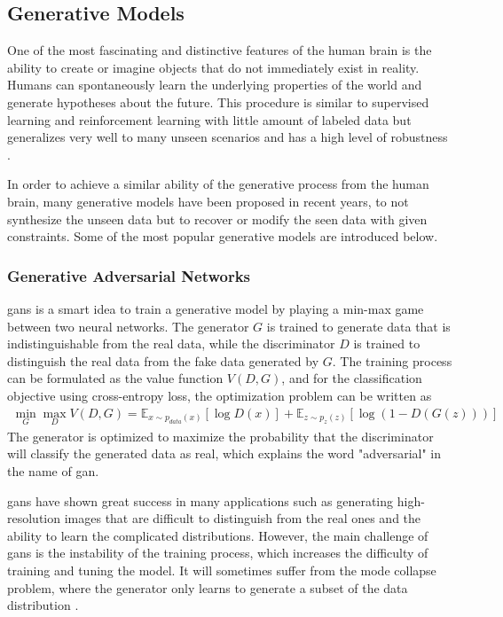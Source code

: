 \documentclass[12pt,DIV14,BCOR12mm,a4paper,footinclude=false,headinclude,parskip=half-,twoside,openright,cleardoublepage=empty,toc=index,bibliography=totoc,listof=totoc]{scrreprt}
\numberwithin{equation}{chapter}
\begin{document}
\subsection{Generative Models}
One of the most fascinating and distinctive features of the human brain is the ability to create or imagine objects that do not immediately exist in reality. Humans can spontaneously learn the underlying properties of the world and generate hypotheses about the future. This procedure is similar to supervised learning and reinforcement learning with little amount of labeled data but generalizes very well to many unseen scenarios and has a high level of robustness \cite{lamb2021brief}.

In order to achieve a similar ability of the generative process from the human brain, many generative models have been proposed in recent years, to not synthesize the unseen data but to recover or modify the seen data with given constraints. Some of the most popular generative models are introduced below.

\subsubsection{Generative Adversarial Networks}
\glspl{gan} \cite{goodfellow2014generative} is a smart idea to train a generative model by playing a min-max game between two neural networks. The generator $G$ is trained to generate data that is indistinguishable from the real data, while the discriminator $D$ is trained to distinguish the real data from the fake data generated by $G$. The training process can be formulated as the value function $V(D,G)$, and for the classification objective using cross-entropy loss, the optimization problem can be written as
\begin{align}
  \min_{G} \max_{D} V(D,G) = \mathbb{E}_{x\sim p_{data}(x)}[\log D(x)] + \mathbb{E}_{z\sim p_{z}(z)}[\log(1-D(G(z)))]
\end{align}
The generator is optimized to maximize the probability that the discriminator will classify the generated data as real, which explains the word "adversarial" in the name of \gls{gan}.

\glspl{gan} have shown great success in many applications such as generating high-resolution images that are difficult to distinguish from the real ones and the ability to learn the complicated distributions. However, the main challenge of \glspl{gan} is the instability of the training process, which increases the difficulty of training and tuning the model. It will sometimes suffer from the mode collapse problem, where the generator only learns to generate a subset of the data distribution \cite{borji2018pros}.
\end{document}
